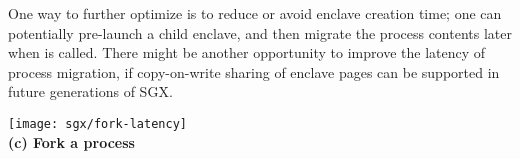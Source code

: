 One way to further optimize  is to reduce or avoid enclave creation time; one can potentially pre-launch a child enclave, and then migrate the process contents later when  is called.
There might be another opportunity to improve the latency of process migration,
if copy-on-write sharing of enclave pages can be supported in future generations of SGX.








\begin{figure*}[t!]
\centering
\begin{minipage}{.45\textwidth}
\centering
\footnotesize
\vspace{6pt}
\texttt{[image: sgx/fork-latency]}\\
\vspace{3pt}
{\bf (c) Fork a process}
\vspace{6pt}
\end{minipage}
\caption{Latency of some expensive system calls in \graphenesgx{}, including opening and reading a secured (authenticated) file, and forking a new process. The results are compared with native Linux and \graphene{}.}
\label{fig:sgx-shield-fork}
\end{figure*}

